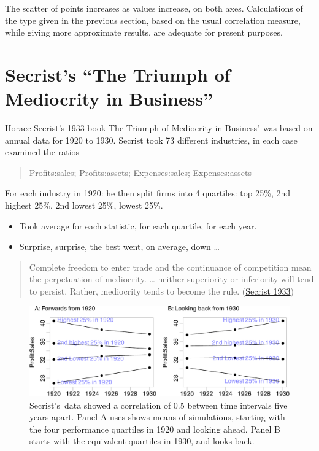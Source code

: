 \documentclass[
  10pt,
  b5paper]{book}
\providecommand{\tightlist}{%
  \setlength{\itemsep}{0pt}\setlength{\parskip}{0pt}}
\begin{document}
The scatter of points increases as values increase, on both axes.
Calculations of the type given in the previous section, based on
the usual correlation measure, while giving more approximate results,
are adequate for present purposes.

\hypertarget{secrists-the-triumph-of-mediocrity-in-business}{%
\section{Secrist's ``The Triumph of Mediocrity in Business''}\label{secrists-the-triumph-of-mediocrity-in-business}}

Horace Secrist's 1933 book The Triumph of Mediocrity in Business"
was based on annual data for 1920 to 1930. Secrist took 73 different
industries, in each case examined the ratios

\begin{quote}
Profits:sales; Profits:assets; Expenses:sales; Expenses:assets
\end{quote}

For each industry in 1920: he then split firms into 4 quartiles: top 25\%,
2nd highest 25\%, 2nd lowest 25\%, lowest 25\%.

\begin{itemize}
\tightlist
\item
  Took average for each statistic, for each quartile, for each year.
\item
  Surprise, surprise, the best went, on average, down \ldots{}
\end{itemize}

\begin{quote}
Complete freedom to enter trade and the continuance of competition
mean the perpetuation of mediocrity. \ldots{} neither superiority or
inferiority will tend to persist. Rather, mediocrity tends to become
the rule. (\protect\hyperlink{ref-secrist1933triumph}{Secrist 1933})
\end{quote}

\begin{figure}[H]

{\centering \includegraphics[width=1.05\linewidth]{07-regress_files/figure-latex/sim-1} 

}

\caption{Secrist's data showed a correlation of 0.5 between
time intervals five years apart.  Panel A uses shows means of simulations,
starting with the four performance quartiles in 1920 and looking ahead.
Panel B starts with the equivalent quartiles in 1930, and looks back.}\label{fig:sim}
\end{figure}
\end{document}
